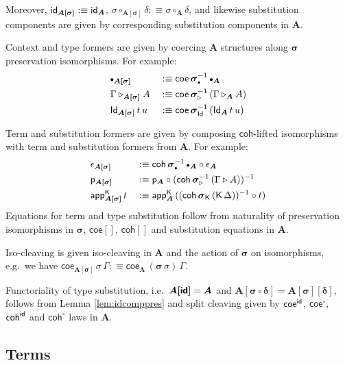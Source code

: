 \documentclass[sigplan,review,anonymous]{acmart}\settopmatter{printfolios=true,printccs=false,printacmref=false}
\newcommand{\ext}{\triangleright}
\newcommand{\emptycon}{\scaleobj{.75}\bullet}
\newcommand{\p}{\mathsf{p}}
\newcommand{\appK}{\mathsf{app}^{\K}}
\newcommand{\bsigma}{\boldsymbol{\sigma}}
\newcommand{\bA}{\boldsymbol{A}}
\newcommand{\ul}[1]{\underline{#1}}
\newcommand{\ulsigma}{\ul{\sigma}}
\newcommand{\coe}{\mathsf{coe}}
\newcommand{\coh}{\mathsf{coh}}
\begin{document}
Moreover, $\id_{\boldsymbol{A[\sigma]}} :\equiv \id_{\bA}$,
$\sigma\circ_{\boldsymbol{A[\sigma]}}\delta :\equiv \sigma\circ_{\bA}\delta$,
and likewise substitution components are given by corresponding substitution
components in $\bA$.

Context and type formers are given by coercing $\bA$
structures along $\bsigma$ preservation isomorphisms. For example:
\begin{alignat*}{3}
  &\emptycon_{\boldsymbol{A[\sigma]}} && :\equiv
    \coe\,\bsigma_{\emptycon}^{-1}\,\emptycon_{\bA}\\
  &\Gamma\ext_{\boldsymbol{A[\sigma]}}A && :\equiv
    \coe\,\bsigma_{\ext}^{-1}\,(\Gamma\ext_{\bA} A)\\
  &\Id_{\boldsymbol{A[\sigma]}}\,t\,u && :\equiv
    \coe\,\bsigma_{\Id}^{-1}\,(\Id_{\bA}\,t\,u)
\end{alignat*}

Term and substitution formers are given by composing $\coh$-lifted
isomorphisms with term and substitution formers from $\bA$. For example:
\begin{alignat*}{3}
  & \epsilon_{\boldsymbol{A[\sigma]}} && :\equiv
    \coh\,\bsigma_{\emptycon}^{-1}\,\emptycon_{\bA} \circ \epsilon_{\bA}\\
  & \p_{\boldsymbol{A[\sigma]}} && :\equiv
    \p_{\bA} \circ (\coh\,\bsigma_{\ext}^{-1}\,(\Gamma\ext A))^{-1}\\
  & \appK_{\boldsymbol{A[\sigma]}}\,t && :\equiv
    \appK_{\bA}\,((\coh\,\bsigma_{\K}\,(\K\,\Delta))^{-1}\circ t)
\end{alignat*}
Equations for term and type substitution follow from naturality of preservation
isomorphisms in $\bsigma$, $\coe[]$, $\coh[]$ and substitution equations in
$\bA$.

Iso-cleaving is given iso-cleaving in $\bA$ and the action of $\bsigma$ on
isomorphisms, e.g.\ we have $\coe_{\boldsymbol{A[\sigma]}}\,\ulsigma\,\Gamma
:\equiv \coe_{\bA}\,(\bsigma\,\ulsigma)\,\Gamma$.

Functoriality of type substitution, i.e.\ $\boldsymbol{A[\id]} = \bA$ and
$\boldsymbol{A[\sigma\circ\delta]} = \boldsymbol{A[\sigma][\delta]}$, follows
from Lemma \ref{lem:idcomppres} and split cleaving given by $\coe^{\id}$,
$\coe^{\circ}$, $\coh^{\id}$ and $\coh^{\circ}$ laws in $\bA$.

\subsection{Terms}
\end{document}
